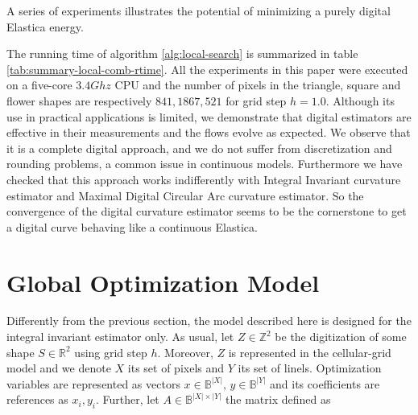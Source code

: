		

A series of experiments  illustrates the potential of minimizing a purely digital Elastica energy. 


The running time of algorithm \ref{alg:local-search} is summarized in table \ref{tab:summary-local-comb-rtime}. All the
experiments in this paper were executed on a five-core $3.4Ghz$ CPU and the number of pixels in the triangle, square and
flower shapes are respectively $841,1867,521$ for grid step $h=1.0$. Although its use in practical applications is
limited, we demonstrate that digital estimators are effective in their measurements and the flows evolve as expected. We
observe that it is a complete digital approach, and we do not suffer from discretization and rounding problems, a common
issue in continuous models.  Furthermore we have checked that this approach works indifferently with Integral Invariant
curvature estimator and Maximal Digital Circular Arc curvature estimator. So the convergence of the digital curvature
estimator seems to be the cornerstone to get a digital curve behaving like a continuous Elastica.  


\section{Global Optimization Model}

Differently from the previous section, the model described here is designed for the integral invariant estimator only. As usual, let $Z \in \mathbb{Z}^2$ be the digitization of some shape $S \in \mathbb{R}^2$ using grid step $h$. Moreover, $Z$ is represented in the cellular-grid model and we denote $X$ its set of pixels and $Y$ its set of linels. Optimization variables are represented as vectors $x \in \mathbb{B}^{|X|},\, y \in \mathbb{B}^{|Y|}$ and its coefficients are references as $x_i,y_i$.  Further, let $A \in \mathbb{B}^{|X|\times |Y|}$ the matrix defined as

